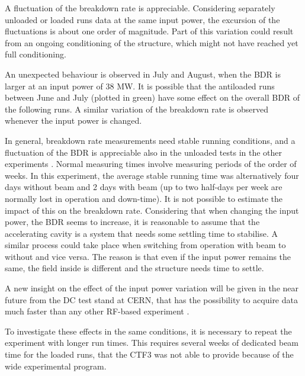 A fluctuation of the breakdown rate is appreciable. Considering separately unloaded or loaded runs data at the same input power, the excursion of the fluctuations is about one order of magnitude. Part of this variation could result from an ongoing conditioning of the structure, which might not have reached yet full conditioning.

An unexpected behaviour is observed in July and August, when the BDR is larger at an input power of 38 MW. It is possible that the antiloaded runs between June and July (plotted in green) have some effect on the overall BDR of the following runs. A similar variation of the breakdown rate is observed whenever the input power is changed.

In general, breakdown rate measurements need stable running conditions, and a fluctuation of the BDR is appreciable also in the unloaded tests in the other experiments \cite{Degiovanni:1742280}. Normal measuring times involve measuring periods of the order of weeks. In this experiment, the average stable running time was alternatively four days without beam and 2 days with beam (up to two half-days per week are normally lost in operation and down-time). It is not possible to estimate the impact of this on the breakdown rate. Considering that when changing the input power, the BDR seems to increase, it is reasonable to assume that the accelerating cavity is a system that needs some settling time to stabilise. A similar process could take place when switching from operation with beam to without and vice versa. The reason is that even if the input power remains the same, the field inside is different and the structure needs time to settle. 

A new insight on the effect of the input power variation will be given in the near future from the DC test stand at CERN, that has the possibility to acquire data much faster than any other RF-based experiment \cite{Walter:PC}.

To investigate these effects in the same conditions, it is necessary to repeat the experiment with longer run times. This requires several weeks of dedicated beam time for the loaded runs, that the CTF3 was not able to provide because of the wide experimental program.

